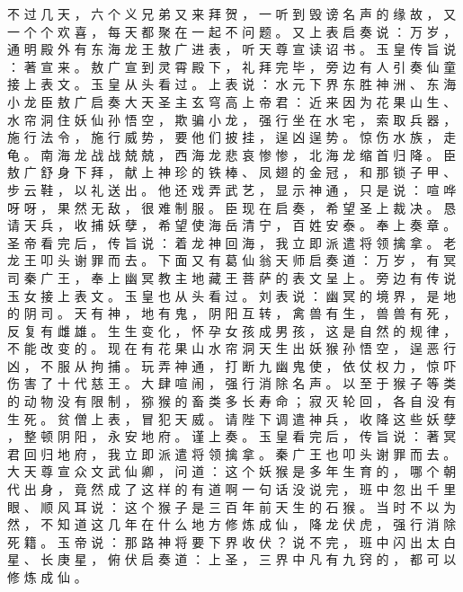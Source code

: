 {不 过 几 天 ， 六 个 义 兄 弟 又 来 拜 贺 ， 一 听 到 毁 谤 名 声 的 缘 故 ， 又 一 个 个 欢 喜 ， 每 天 都 聚 在 一 起 不 问 题 。
又 上 表 启 奏 说 ： 万 岁 ， 通 明 殿 外 有 东 海 龙 王 敖 广 进 表 ， 听 天 尊 宣 读 诏 书 。
玉 皇 传 旨 说 ： 著 宣 来 。
敖 广 宣 到 灵 霄 殿 下 ， 礼 拜 完 毕 ， 旁 边 有 人 引 奏 仙 童 接 上 表 文 。
玉 皇 从 头 看 过 。
上 表 说 ： 水 元 下 界 东 胜 神 洲 、 东 海 小 龙 臣 敖 广 启 奏 大 天 圣 主 玄 穹 高 上 帝 君 ： 近 来 因 为 花 果 山 生 、 水 帘 洞 住 妖 仙 孙 悟 空 ， 欺 骗 小 龙 ， 强 行 坐 在 水 宅 ， 索 取 兵 器 ， 施 行 法 令 ， 施 行 威 势 ， 要 他 们 披 挂 ， 逞 凶 逞 势 。
惊 伤 水 族 ， 走 龟 。
南 海 龙 战 战 兢 兢 ， 西 海 龙 悲 哀 惨 惨 ， 北 海 龙 缩 首 归 降 。
臣 敖 广 舒 身 下 拜 ， 献 上 神 珍 的 铁 棒 、 凤 翅 的 金 冠 ， 和 那 锁 子 甲 、 步 云 鞋 ， 以 礼 送 出 。
他 还 戏 弄 武 艺 ， 显 示 神 通 ， 只 是 说 ： 喧 哗 呀 呀 ， 果 然 无 敌 ， 很 难 制 服 。
臣 现 在 启 奏 ， 希 望 圣 上 裁 决 。
恳 请 天 兵 ， 收 捕 妖 孽 ， 希 望 使 海 岳 清 宁 ， 百 姓 安 泰 。
奉 上 奏 章 。
圣 帝 看 完 后 ， 传 旨 说 ： 着 龙 神 回 海 ， 我 立 即 派 遣 将 领 擒 拿 。
老 龙 王 叩 头 谢 罪 而 去 。
下 面 又 有 葛 仙 翁 天 师 启 奏 道 ： 万 岁 ， 有 冥 司 秦 广 王 ， 奉 上 幽 冥 教 主 地 藏 王 菩 萨 的 表 文 呈 上 。
旁 边 有 传 说 玉 女 接 上 表 文 。
玉 皇 也 从 头 看 过 。
刘 表 说 ： 幽 冥 的 境 界 ， 是 地 的 阴 司 。
天 有 神 ， 地 有 鬼 ， 阴 阳 互 转 ， 禽 兽 有 生 ， 兽 兽 有 死 ， 反 复 有 雌 雄 。
生 生 变 化 ， 怀 孕 女 孩 成 男 孩 ， 这 是 自 然 的 规 律 ， 不 能 改 变 的 。
现 在 有 花 果 山 水 帘 洞 天 生 出 妖 猴 孙 悟 空 ， 逞 恶 行 凶 ， 不 服 从 拘 捕 。
玩 弄 神 通 ， 打 断 九 幽 鬼 使 ， 依 仗 权 力 ， 惊 吓 伤 害 了 十 代 慈 王 。
大 肆 喧 闹 ， 强 行 消 除 名 声 。
以 至 于 猴 子 等 类 的 动 物 没 有 限 制 ， 猕 猴 的 畜 类 多 长 寿 命 ； 寂 灭 轮 回 ， 各 自 没 有 生 死 。
贫 僧 上 表 ， 冒 犯 天 威 。
请 陛 下 调 遣 神 兵 ， 收 降 这 些 妖 孽 ， 整 顿 阴 阳 ， 永 安 地 府 。
谨 上 奏 。
玉 皇 看 完 后 ， 传 旨 说 ： 著 冥 君 回 归 地 府 ， 我 立 即 派 遣 将 领 擒 拿 。
秦 广 王 也 叩 头 谢 罪 而 去 。
大 天 尊 宣 众 文 武 仙 卿 ， 问 道 ： 这 个 妖 猴 是 多 年 生 育 的 ， 哪 个 朝 代 出 身 ， 竟 然 成 了 这 样 的 有 道 啊 一 句 话 没 说 完 ， 班 中 忽 出 千 里 眼 、 顺 风 耳 说 ： 这 个 猴 子 是 三 百 年 前 天 生 的 石 猴 。
当 时 不 以 为 然 ， 不 知 道 这 几 年 在 什 么 地 方 修 炼 成 仙 ， 降 龙 伏 虎 ， 强 行 消 除 死 籍 。
玉 帝 说 ： 那 路 神 将 要 下 界 收 伏 ？ 说 不 完 ， 班 中 闪 出 太 白 星 、 长 庚 星 ， 俯 伏 启 奏 道 ： 上 圣 ， 三 界 中 凡 有 九 窍 的 ， 都 可 以 修 炼 成 仙 。
}
